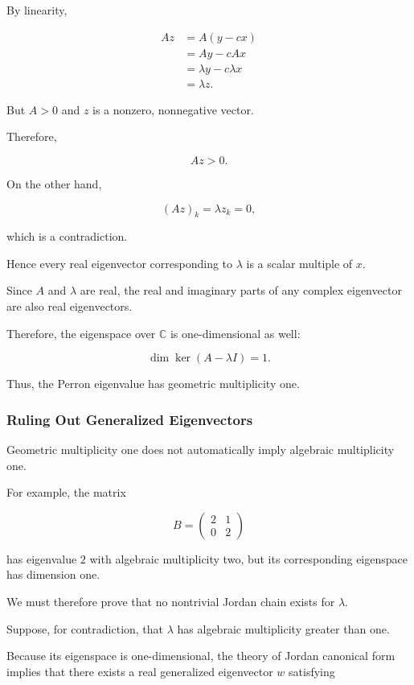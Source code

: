 \documentclass[11pt,a4paper]{article}
\theoremstyle{definition}
\theoremstyle{remark}
\begin{document}
By linearity,

\[
\begin{aligned}
Az
&=A(y-cx)\\
&=Ay-cAx\\
&=\lambda y-c\lambda x\\
&=\lambda z.
\end{aligned}
\]

But $A>0$ and $z$ is a
nonzero, nonnegative vector.

Therefore,

\[
Az>0.
\]

On the other hand,

\[
(Az)_k=\lambda z_k=0,
\]

which is a contradiction.

Hence every real eigenvector
corresponding to $\lambda$
is a scalar multiple of $x$.

Since $A$ and $\lambda$
are real, the real and
imaginary parts of any
complex eigenvector are
also real eigenvectors.

Therefore, the eigenspace
over $\mathbb{C}$ is
one-dimensional as well:

\begin{equation}
\boxed{
\dim\ker(A-\lambda I)=1.
}
\label{eq:perron_geometric_simple}
\end{equation}

Thus, the Perron eigenvalue
has geometric multiplicity one.


\subsubsection{Ruling Out Generalized Eigenvectors}

Geometric multiplicity one
does not automatically imply
algebraic multiplicity one.

For example, the matrix

\[
B=
\begin{pmatrix}
2&1\\
0&2
\end{pmatrix}
\]

has eigenvalue $2$ with
algebraic multiplicity two,
but its corresponding
eigenspace has dimension one.

We must therefore prove
that no nontrivial Jordan
chain exists for $\lambda$.

Suppose, for contradiction,
that $\lambda$ has algebraic
multiplicity greater than one.

Because its eigenspace is
one-dimensional, the theory
of Jordan canonical form
implies that there exists
a real generalized
eigenvector $w$ satisfying
\end{document}
